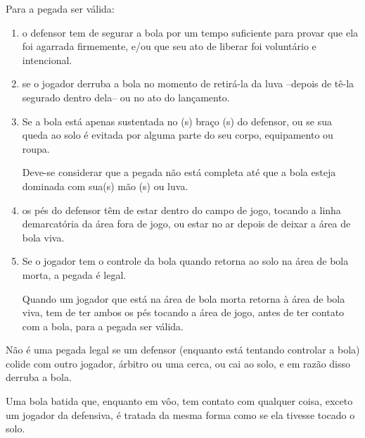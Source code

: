 	Para a pegada ser v\'alida:
	\begin{enumerate}[label=\alph*)]
	\item o defensor tem de segurar a bola por um tempo suficiente para provar que ela foi agarrada firmemente, e/ou que seu ato de liberar foi volunt\'ario e intencional. 
	
	\item se o jogador derruba a bola no momento de retir\'a-la da luva –depois de t\^e-la segurado dentro dela– ou no ato do lan\c{c}amento. 
	
	\item  Se a bola est\'a apenas sustentada no (s) bra\c{c}o (s) do defensor, ou se sua queda ao solo \'e evitada por alguma parte do seu corpo, equipamento ou roupa. 
	
	Deve-se considerar que a pegada n\~ao est\'a completa at\'e que a bola esteja dominada com sua(s) m\~ao (s) ou luva. 
	
	\item  os p\'es do defensor t\^em de estar dentro do campo de jogo, tocando a linha demarcat\'oria da \'area fora de jogo, ou estar no ar depois de deixar a \'area de bola viva. 
	
	\item Se o jogador tem o controle da bola quando retorna ao solo na \'area de bola morta, a pegada \'e legal. 
	
	Quando um jogador que est\'a na \'area de bola morta retorna \`a \'area de bola viva, tem de ter ambos os p\'es tocando a \'area de jogo, antes de ter contato com a bola, para a pegada ser v\'alida. 
\end{enumerate}

	N\~ao \'e uma pegada legal se um defensor (enquanto est\'a tentando controlar a bola) colide com outro jogador, \'arbitro ou uma cerca, ou cai ao solo, e em raz\~ao disso derruba a bola. 
	
	Uma bola batida que, enquanto em v\^oo, tem contato com qualquer coisa, exceto um jogador da defensiva, \'e tratada da mesma forma como se ela tivesse tocado o solo. 



